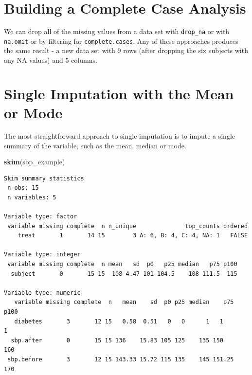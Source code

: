 \documentclass[]{book}
\newenvironment{Shaded}{\begin{snugshade}}{\end{snugshade}}
\newcommand{\KeywordTok}[1]{\textcolor[rgb]{0.13,0.29,0.53}{\textbf{#1}}}
\newcommand{\DecValTok}[1]{\textcolor[rgb]{0.00,0.00,0.81}{#1}}
\newcommand{\StringTok}[1]{\textcolor[rgb]{0.31,0.60,0.02}{#1}}
\newcommand{\OperatorTok}[1]{\textcolor[rgb]{0.81,0.36,0.00}{\textbf{#1}}}
\newcommand{\NormalTok}[1]{#1}
\theoremstyle{definition}
\theoremstyle{definition}
\theoremstyle{definition}
\theoremstyle{remark}
\begin{document}
\section{Building a Complete Case
Analysis}\label{building-a-complete-case-analysis}

We can drop all of the missing values from a data set with
\texttt{drop\_na} or with \texttt{na.omit} or by filtering for
\texttt{complete.cases}. Any of these approaches produces the same
result - a new data set with 9 rows (after dropping the six subjects
with any NA values) and 5 columns.

\begin{Shaded}
\end{Shaded}

\section{Single Imputation with the Mean or
Mode}\label{single-imputation-with-the-mean-or-mode}

The most straightforward approach to single imputation is to impute a
single summary of the variable, such as the mean, median or mode.

\begin{Shaded}
\begin{Highlighting}[]
\KeywordTok{skim}\NormalTok{(sbp_example)}
\end{Highlighting}
\end{Shaded}

\begin{verbatim}
Skim summary statistics
 n obs: 15 
 n variables: 5 

Variable type: factor 
 variable missing complete  n n_unique              top_counts ordered
    treat       1       14 15        3 A: 6, B: 4, C: 4, NA: 1   FALSE

Variable type: integer 
 variable missing complete  n mean   sd  p0   p25 median   p75 p100
  subject       0       15 15  108 4.47 101 104.5    108 111.5  115

Variable type: numeric 
   variable missing complete  n   mean    sd  p0 p25 median    p75 p100
   diabetes       3       12 15   0.58  0.51   0   0      1   1       1
  sbp.after       0       15 15 136    15.83 105 125    135 150     160
 sbp.before       3       12 15 143.33 15.72 115 135    145 151.25  170
\end{verbatim}
\end{document}
